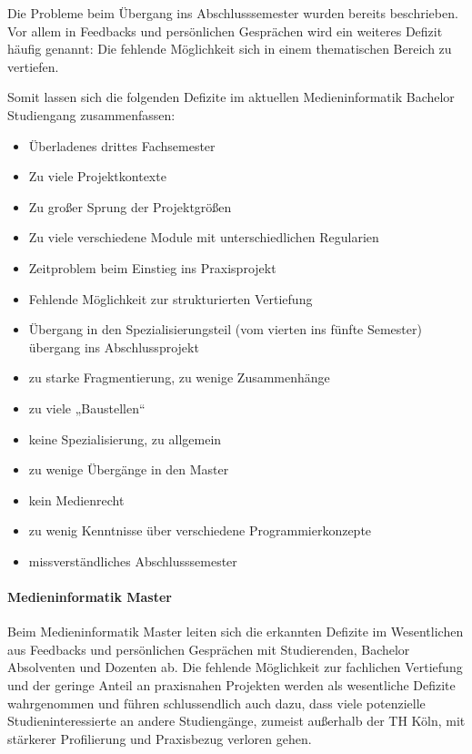 Die Probleme beim Übergang ins Abschlusssemester wurden bereits
beschrieben. Vor allem in Feedbacks und persönlichen Gesprächen wird ein
weiteres Defizit häufig genannt: Die fehlende Möglichkeit sich in einem
thematischen Bereich zu vertiefen.

Somit lassen sich die folgenden Defizite im aktuellen Medieninformatik
Bachelor Studiengang zusammenfassen:

\begin{itemize}
\tightlist
\item
  Überladenes drittes Fachsemester
\item
  Zu viele Projektkontexte
\item
  Zu großer Sprung der Projektgrößen
\item
  Zu viele verschiedene Module mit unterschiedlichen Regularien
\item
  Zeitproblem beim Einstieg ins Praxisprojekt
\item
  Fehlende Möglichkeit zur strukturierten Vertiefung
\item
  Übergang in den Spezialisierungsteil (vom vierten ins fünfte Semester)
  übergang ins Abschlussprojekt
\item
  zu starke Fragmentierung, zu wenige Zusammenhänge
\item
  zu viele „Baustellen``
\item
  keine Spezialisierung, zu allgemein
\item
  zu wenige Übergänge in den Master
\item
  kein Medienrecht
\item
  zu wenig Kenntnisse über verschiedene Programmierkonzepte
\item
  missverständliches Abschlusssemester
\end{itemize}

\paragraph{Medieninformatik Master}\label{medieninformatik-master}

Beim Medieninformatik Master leiten sich die erkannten Defizite im
Wesentlichen aus Feedbacks und persönlichen Gesprächen mit Studierenden,
Bachelor Absolventen und Dozenten ab. Die fehlende Möglichkeit zur
fachlichen Vertiefung und der geringe Anteil an praxisnahen Projekten
werden als wesentliche Defizite wahrgenommen und führen schlussendlich
auch dazu, dass viele potenzielle Studieninteressierte an andere
Studiengänge, zumeist außerhalb der TH Köln, mit stärkerer Profilierung
und Praxisbezug verloren gehen.

